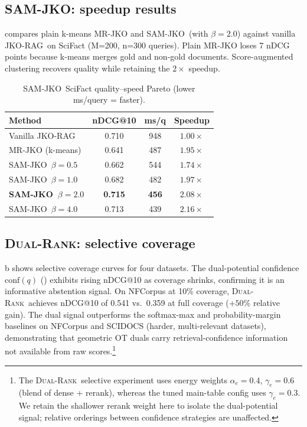 \documentclass{article}
\theoremstyle{plain}
\newcommand{\jko}{\textsc{JKO-RAG}}
\newcommand{\samjko}{\textsc{SAM-JKO}}
\newcommand{\dualrank}{\textsc{Dual-Rank}}
\begin{document}
\subsection{\samjko: speedup results}

 compares plain k-means MR-JKO and \samjko\ (with $\beta{=}2.0$) against vanilla \jko\ on SciFact (M=200, n=300 queries). Plain MR-JKO loses 7 nDCG points because k-means merges gold and non-gold documents. Score-augmented clustering recovers quality while retaining the $2\times$ speedup.

\begin{table}[h]
\centering\small
\caption{\samjko\ SciFact quality--speed Pareto (lower ms/query = faster).}
\label{tab:sam}
\begin{tabular}{@{}lccc@{}}
\toprule
Method & nDCG@10 & ms/q & Speedup \\
\midrule
Vanilla \jko       & 0.710 & 948 & $1.00\times$ \\
MR-JKO (k-means)   & 0.641 & 487 & $1.95\times$ \\
\samjko\ $\beta{=}0.5$ & 0.662 & 544 & $1.74\times$ \\
\samjko\ $\beta{=}1.0$ & 0.682 & 482 & $1.97\times$ \\
\textbf{\samjko\ $\beta{=}2.0$} & \textbf{0.715} & \textbf{456} & $\mathbf{2.08\times}$ \\
\samjko\ $\beta{=}4.0$ & 0.713 & 439 & $2.16\times$ \\
\bottomrule
\end{tabular}
\end{table}

\subsection{\dualrank: selective coverage}

b shows selective coverage curves for four datasets. The dual-potential confidence $\mathrm{conf}(q)$ () exhibits rising nDCG@10 as coverage shrinks, confirming it is an informative abstention signal. On NFCorpus at 10\% coverage, \dualrank\ achieves nDCG@10 of 0.541 vs.\ 0.359 at full coverage ($+50\%$ relative gain). The dual signal outperforms the softmax-max and probability-margin baselines on NFCorpus and SCIDOCS (harder, multi-relevant datasets), demonstrating that geometric OT duals carry retrieval-confidence information not available from raw scores.\footnote{The \dualrank\ selective experiment uses energy weights $\alpha_e{=}0.4$, $\gamma_e{=}0.6$ (blend of dense + rerank), whereas the tuned main-table config uses $\gamma_e{=}0.3$. We retain the shallower rerank weight here to isolate the dual-potential signal; relative orderings between confidence strategies are unaffected.}
\end{document}

